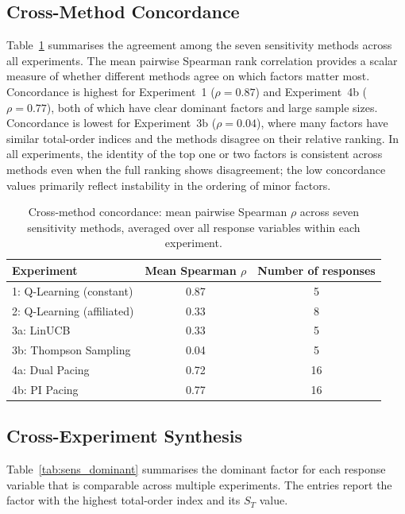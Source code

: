\subsection{Cross-Method Concordance}
\label{sec:sens_concordance}

Table~\ref{tab:sens_concordance} summarises the agreement among the seven sensitivity methods across all experiments. The mean pairwise Spearman rank correlation provides a scalar measure of whether different methods agree on which factors matter most. Concordance is highest for Experiment~1 ($\rho = 0.87$) and Experiment~4b ($\rho = 0.77$), both of which have clear dominant factors and large sample sizes. Concordance is lowest for Experiment~3b ($\rho = 0.04$), where many factors have similar total-order indices and the methods disagree on their relative ranking. In all experiments, the identity of the top one or two factors is consistent across methods even when the full ranking shows disagreement; the low concordance values primarily reflect instability in the ordering of minor factors.

\begin{table}[H]
\centering
\caption{Cross-method concordance: mean pairwise Spearman $\rho$ across seven sensitivity methods, averaged over all response variables within each experiment.}
\label{tab:sens_concordance}
\small
\begin{tabular}{lcc}
\toprule
Experiment & Mean Spearman $\rho$ & Number of responses \\
\midrule
1: Q-Learning (constant)       & 0.87 & 5 \\
2: Q-Learning (affiliated)     & 0.33 & 8 \\
3a: LinUCB                     & 0.33 & 5 \\
3b: Thompson Sampling          & 0.04 & 5 \\
4a: Dual Pacing                & 0.72 & 16 \\
4b: PI Pacing                  & 0.77 & 16 \\
\bottomrule
\end{tabular}
\end{table}

\subsection{Cross-Experiment Synthesis}
\label{sec:sens_synthesis}

Table~\ref{tab:sens_dominant} summarises the dominant factor for each response variable that is comparable across multiple experiments. The entries report the factor with the highest total-order index and its $S_T$ value.

